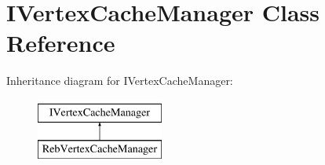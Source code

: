 \hypertarget{class_i_vertex_cache_manager}{}\section{I\+Vertex\+Cache\+Manager Class Reference}
\label{class_i_vertex_cache_manager}
Inheritance diagram for I\+Vertex\+Cache\+Manager\+:\begin{figure}[H]
\begin{center}
\leavevmode
\includegraphics[height=2.000000cm]{class_i_vertex_cache_manager}
\end{center}
\end{figure}
